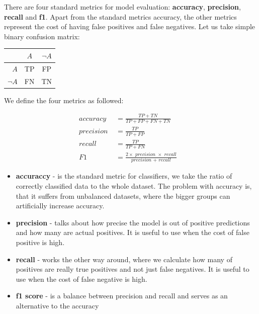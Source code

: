 There are four standard metrics \cite{nn-metrics} for model evaluation: \textbf{accuracy}, \textbf{precision}, \textbf{recall} and \textbf{f1}. Apart from the standard metrics accuracy, the other metrics represent the cost of having false positives and false negatives. Let us take simple binary confusion matrix:

\begin{table}[h]
\centering
\begin{tabular}{|r|c c|}

\hline 
& $A$ & $\neg A$ \\
\hline 
$A$ & TP & FP \\
$\neg A$ & FN & TN\footnotemark\\

\hline

\end{tabular}

\end{table}


\noindent
We define the four metrics as followed:

\begin{align*}
\textit{accuracy } & = \frac{TP + TN}{TP + FP + FN + TN} & \\
\textit{precision } & = \frac{TP}{TP + FP} & \\
\textit{recall } & = \frac{TP}{TP + FN} & \\
\textit{F1 } & = \frac{2 \times \textit{ precision } \times \textit{ recall}}{\textit{precision } + \textit{ recall}} &
\end{align*}

\begin{itemize}

\item \textbf{accuraccy} - is the standard metric for classifiers, we take the ratio of correctly classified data to the whole dataset. The problem with accuracy is, that it suffers from unbalanced datasets, where the bigger groups can artificially increase accuracy.

\item \textbf{precision} - talks about how precise the model is out of positive predictions and how many are actual positives. It is useful to use when the cost of false positive is high.

\item \textbf{recall} - works the other way around, where we calculate how many of positives are really true positives and not just false negatives. It is useful to use when the cost of false negative is high.

\item \textbf{f1 score} - is a balance between precision and recall and serves as an alternative to the accuracy

\end{itemize}

